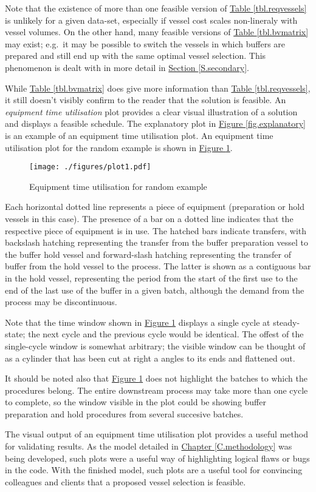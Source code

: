Note that the existence of more than one feasible version of 
\hyperref[tbl.reqvessels]{Table \ref*{tbl.reqvessels}} is unlikely for a given
data-set, especially if vessel cost scales non-lineraly with vessel volumes.
On the other hand, many feasible versions of
\hyperref[tbl.bvmatrix]{Table \ref*{tbl.bvmatrix}} may exist; e.g.\ it may be
possible to switch the vessels in which buffers are prepared and still end up
with the same optimal vessel selection.
This phenomenon is dealt with in more detail in 
\hyperref[S.secondary]{Section \ref*{S.secondary}}.

While \hyperref[tbl.bvmatrix]{Table \ref*{tbl.bvmatrix}} does give more
information than \hyperref[tbl.reqvessels]{Table \ref*{tbl.reqvessels}},
it still doesn't visibly confirm to the reader that the solution is feasible.
An \emph{equipment time utilisation} plot provides a clear visual illustration
of a solution and displays a feasible schedule.
The explanatory plot in 
\hyperref[fig.explanatory]{Figure \ref*{fig.explanatory}} is an example of an
equipment time utilisation plot.  
An equipment time utilisation plot for the random example is shown in
\hyperref[fig.etu1]{Figure \ref*{fig.etu1}}.
\begin{figure}
    \centering
    \texttt{[image: ./figures/plot1.pdf]}
    \caption{Equipment time utilisation for random example}
    \label{fig.etu1}
\end{figure}
Each horizontal dotted line represents a piece of equipment (preparation or
hold vessels in this case).
The presence of a bar on a dotted line indicates that the respective piece of
equipment is in use.  
The hatched bars indicate transfers, with backslash hatching representing the
transfer from the buffer preparation vessel to the buffer hold vessel and
forward-slash hatching representing the transfer of buffer from the hold vessel
to the process.
The latter is shown as a contiguous bar in the hold vessel, representing the
period from the start of the first use to the end of the last use of the buffer
in a given batch, although the demand from the process may be discontinuous.

Note that the time window shown in \hyperref[fig.etu1]{Figure \ref*{fig.etu1}}
displays a single cycle at steady-state; the next cycle and the previous cycle
would be identical.
The offest of the single-cycle window is somewhat arbitrary; the
visible window can be thought of as a cylinder that has been cut at right a
angles to its ends and flattened out.

It should be noted also that \hyperref[fig.etu1]{Figure \ref*{fig.etu1}}
does not highlight the batches to which the procedures belong.
The entire downstream process may take more than one cycle to complete, so the
window visible in the plot could be showing buffer preparation and hold
procedures from several succesive batches.

The visual output of an equipment time utilisation plot provides a useful
method for validating results.
As the model detailed in 
\hyperref[C.methodology]{Chapter \ref*{C.methodology}} was being developed,
such plots were a useful way of highlighting logical flaws or bugs in the code.
With the finished model, such plots are a useful tool for convincing
colleagues and clients that a proposed vessel selection is feasible.
